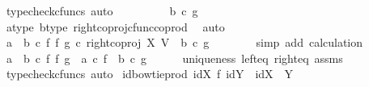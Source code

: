 \begin{isabellebody}
\ {\isacharparenleft}{\kern0pt}typecheck{\isacharunderscore}{\kern0pt}cfuncs{\isacharcomma}{\kern0pt}\ auto{\isacharparenright}{\kern0pt}\isanewline
\ \ \ \ \isamarkupfalse%
\ \isamarkupfalse%
\ {\isachardoublequoteopen}{\isachardot}{\kern0pt}{\isachardot}{\kern0pt}{\isachardot}{\kern0pt}\ {\isacharequal}{\kern0pt}\ {\isacharparenleft}{\kern0pt}b\ {\isasymcirc}\isactrlsub c\ g{\isacharparenright}{\kern0pt}{\isachardoublequoteclose}\isanewline
\ \ \ \ \ \ \isamarkupfalse%
\ a{\isacharunderscore}{\kern0pt}type\ b{\isacharunderscore}{\kern0pt}type\ right{\isacharunderscore}{\kern0pt}coproj{\isacharunderscore}{\kern0pt}cfunc{\isacharunderscore}{\kern0pt}coprod\ \isamarkupfalse%
\ auto\isanewline
\ \ \ \ \isamarkupfalse%
\ \isamarkupfalse%
\ {\isachardoublequoteopen}{\isacharparenleft}{\kern0pt}a\ {\isasymamalg}\ b\ {\isasymcirc}\isactrlsub c\ f\ {\isasymbowtie}\isactrlsub f\ g{\isacharparenright}{\kern0pt}\ {\isasymcirc}\isactrlsub c\ right{\isacharunderscore}{\kern0pt}coproj\ X\ V\ {\isacharequal}{\kern0pt}\ {\isacharparenleft}{\kern0pt}b\ {\isasymcirc}\isactrlsub c\ g{\isacharparenright}{\kern0pt}{\isachardoublequoteclose}\isanewline
\ \ \ \ \ \ \isamarkupfalse%
\ {\isacharparenleft}{\kern0pt}simp\ add{\isacharcolon}{\kern0pt}\ calculation{\isacharparenright}{\kern0pt}\isanewline
\ \ \isamarkupfalse%
\isanewline
\isanewline
\ \ \isamarkupfalse%
\ {\isachardoublequoteopen}{\isacharparenleft}{\kern0pt}a\ {\isasymamalg}\ b{\isacharparenright}{\kern0pt}\ {\isasymcirc}\isactrlsub c\ {\isacharparenleft}{\kern0pt}f\ {\isasymbowtie}\isactrlsub f\ g{\isacharparenright}{\kern0pt}\ {\isacharequal}{\kern0pt}\ {\isacharparenleft}{\kern0pt}a\ {\isasymcirc}\isactrlsub c\ f{\isacharparenright}{\kern0pt}\ {\isasymamalg}\ {\isacharparenleft}{\kern0pt}b\ {\isasymcirc}\isactrlsub c\ g{\isacharparenright}{\kern0pt}{\isachardoublequoteclose}\isanewline
\ \ \ \ \isamarkupfalse%
\ uniqueness\ left{\isacharunderscore}{\kern0pt}eq\ right{\isacharunderscore}{\kern0pt}eq\ assms\isanewline
\ \ \ \ \isamarkupfalse%
\ {\isacharparenleft}{\kern0pt}typecheck{\isacharunderscore}{\kern0pt}cfuncs{\isacharcomma}{\kern0pt}\ auto{\isacharparenright}{\kern0pt}\isanewline
{}\isamarkupfalse%
%
\endisatagproof
{\isafoldproof}%
%
\isadelimproof
\isanewline
%
\endisadelimproof
\isanewline
{}\isamarkupfalse%
\ id{\isacharunderscore}{\kern0pt}bowtie{\isacharunderscore}{\kern0pt}prod{\isacharcolon}{\kern0pt}\ {\isachardoublequoteopen}id{\isacharparenleft}{\kern0pt}X{\isacharparenright}{\kern0pt}\ {\isasymbowtie}\isactrlsub f\ id{\isacharparenleft}{\kern0pt}Y{\isacharparenright}{\kern0pt}\ {\isacharequal}{\kern0pt}\ id{\isacharparenleft}{\kern0pt}X\ {\isasymCoprod}\ Y{\isacharparenright}{\kern0pt}{\isachardoublequoteclose}\isanewline

\end{isabellebody}
